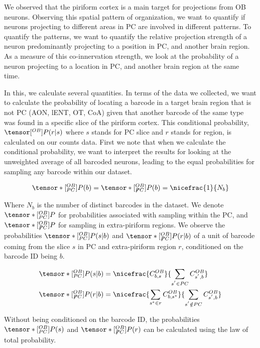 \documentclass[../dissertation.tex]{subfiles}
\begin{document}
We observed that the piriform cortex is a main target for projections from OB neurons.
Observing this spatial pattern of organization, we want to quantify if neurons projecting to different areas in PC are involved in different patterns.
To quantify the patterns, we want to quantify the relative projection strength of a neuron predominantly projecting to a position in PC, and another brain region.
As a measure of this co-innervation strength, we look at the probability of a neuron projecting to a location in PC, and another brain region at the same time.

In this, we calculate several quantities.
In terms of the data we collected, we want to calculate the probability of locating a barcode in a target brain region that is not PC (AON, lENT, OT, CoA) given that another barcode of the same type was found in a specific slice of the piriform cortex.
This conditional probability, $\tensor[^{OB}]{P}{} (r|s)$ where $s$ stands for PC slice and $r$ stands for region, is calculated on our counts data.
First we note that when we calculate the conditional probability, we want to interpret the results for looking at the unweighted average of all barcoded neurons, leading to the equal probabilities for sampling any barcode within our dataset.

\begin{align}
    \tensor*[^{OB}_{PC}]{P}{} (b) = \tensor*[^{OB}_{\not PC}]{P}{} (b) = \nicefrac{1}{N_b}
\end{align}

Where $N_b$ is the number of distinct barcodes in the dataset.
We denote $\tensor*[^{OB}_{PC}]{P}{}$ for probabilities associated with sampling within the PC,
and $\tensor*[^{OB}_{\not PC}]{P}{}$ for sampling in extra-piriform regions.
We observe the probabilities $\tensor*[^{OB}_{PC}]{P}{} (s|b)$ and $\tensor*[^{OB}_{\not PC}]{P}{} (r|b)$ of a unit of barcode coming from the slice $s$ in PC and extra-piriform region $r$, conditioned on the barcode ID being $b$.

\begin{align}
    \tensor*[^{OB}_{PC}]{P}{}      (s | b) & = \nicefrac{ C^{OB}_{b,s}                        }{ \sum_{s^{'} \in    PC} C^{OB}_{s^{'}, b} } \\
    \tensor*[^{OB}_{\not PC}]{P}{} (r | b) & = \nicefrac{ \sum_{s^{*} \in r} C^{OB}_{b,s^{*}} }{ \sum_{s^{'} \notin PC} C^{OB}_{s^{'}, b} }
\end{align}

Without being conditioned on the barcode ID, the probabilities $\tensor*[^{OB}_{PC}]{P}{} (s)$ and $\tensor*[^{OB}_{\not PC}]{P}{} (r)$ can be calculated using the law of total probability.
\end{document}
